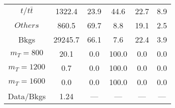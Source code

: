 \begin{figure}
\begin{minipage}[c]{0.32\textwidth}
{\begin{tabular}{cccccc}
$ t/t\bar{t} $ &  1322.4 &  23.9 &  44.6 &  22.7 &  8.9\\
$ Others $ &  860.5 &  69.7 &  8.8 &  19.1 &  2.5\\
Bkgs &  29245.7 &  66.1 &  7.6 &  22.4 &  3.9\\
$ m_{T} = 800 $ &  20.1 &  0.0 &  100.0 &  0.0 &  0.0\\
$ m_{T} = 1200 $ &  0.7 &  0.0 &  100.0 &  0.0 &  0.0\\
$ m_{T} = 1600 $ &  0.0 &  0.0 &  100.0 &  0.0 &  0.0\\
Data/Bkgs &  1.24 &  --- &  --- &  --- &  ---\\
\hline
\end{tabular}
}
\end{minipage}
\end{figure}

